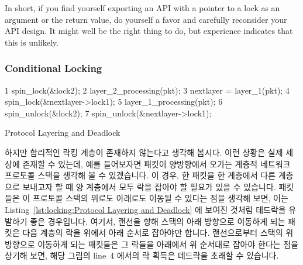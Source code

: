 In short, if you find yourself exporting an API with a pointer to a
lock as an argument or the return value, do yourself a favor and carefully
reconsider your API design.
It might well be the right thing to do, but experience indicates that
this is unlikely.
\fi

\subsubsection{Conditional Locking}
\label{sec:locking:Conditional Locking}

\begin{listing}[tbp]
{ \scriptsize
\begin{verbbox}
  1 spin_lock(&lock2);
  2 layer_2_processing(pkt);
  3 nextlayer = layer_1(pkt);
  4 spin_lock(&nextlayer->lock1);
  5 layer_1_processing(pkt);
  6 spin_unlock(&lock2);
  7 spin_unlock(&nextlayer->lock1);
\end{verbbox}
}
\centering
\theverbbox
\caption{Protocol Layering and Deadlock}
\label{lst:locking:Protocol Layering and Deadlock}
\end{listing}

하지만 합리적인 락킹 계층이 존재하지 않는다고 생각해 봅시다.
이런 상황은 실제 세상에 존재할 수 있는데, 예를 들어보자면 패킷이 양방향에서
오가는 계층적 네트워크 프로토콜 스택을 생각해 볼 수 있겠습니다.
이 경우, 한 패킷을 한 계층에서 다른 계층으로 보내고자 할 때 양 계층에서 모두
락을 잡아야 할 필요가 있을 수 있습니다.
패킷들은 이 프로토콜 스택의 위로도 아래로도 이동될 수 있다는 점을 생각해 보면, 
이는 Listing~\ref{lst:locking:Protocol Layering and Deadlock} 에 보여진 것처럼
데드락을 유발하기 좋은 경우입니다.
여기서, 랜선을 향해 스택의 아래 방향으로 이동하게 되는 패킷은 다음 계층의 락을
위에서 아래 순서로 잡아야만 합니다.
랜선으로부터 스택의 위 방향으로 이동하게 되는 패킷들은 그 락들을 아래에서 위
순서대로 잡아야 한다는 점을 상기해 보면, 해당 그림의 line~4 에서의 락 획득은
데드락을 초래할 수 있습니다.

